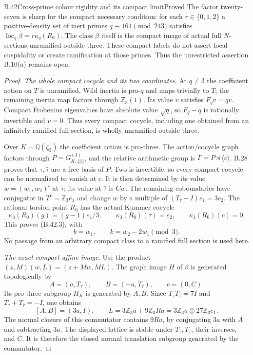 \begin{statement}{B.42}{Cross-prime colour rigidity and its compact limit}{Proved}
The factor twenty-seven is sharp for the compact necessary condition:
for each $r\in\{0,1,2\}$ a positive-density set of inert primes
$q\equiv161\pmod{243}$ satisfies
$\operatorname{loc}_q\beta=r\kappa_q(R_0)$.
The class $\beta$ itself is the compact image of actual full
$N$-sections unramified outside three.  These compact labels do not
assert local cuspidality or create ramification at those primes.
Thus the unrestricted assertion B.10(a) remains open.
\end{statement}
\begin{proof}
\emph{The whole compact cocycle and its two coordinates.}
At $q\ne3$ the coefficient action on $T$ is unramified.
Wild inertia is pro-$q$ and maps trivially to $T$; the remaining
inertia map factors through $\mathbb Z_3(1)$.  Its value $v$
satisfies $F_qv=qv$.  Compact Frobenius eigenvalues have absolute
value $\sqrt q$, so $F_q-q$ is rationally invertible and $v=0$.
Thus every compact cocycle, including one obtained from an infinitely
ramified full section, is wholly unramified outside three.

Over $K=\mathbb Q(\zeta_3)$ the coefficient action is pro-three.
The action/cocycle graph factors through
$P=G_{K,\{3\}}^{(3)}$, and the relative arithmetic group is
$\Gamma=P\rtimes\langle c\rangle$.  B.28 proves that
$\tau,\bar\tau$ are a free basis of $P$.  Two is invertible, so
every compact cocycle can be normalized to vanish at $c$.
It is then determined by its value $w=(w_1,w_2)^t$ at $\tau$;
its value at $\bar\tau$ is $Cw$.
The remaining coboundaries have conjugator in
$T^c=\mathbb Z_3e_1$ and change $w$ by a multiple of
$(T_\tau-I)e_1=3e_2$.  The rational torsion point $R_0$ has
the actual Kummer cocycle
\[
 \kappa_3(R_0)(g)=(g-1)e_1/3,
 \qquad \kappa_3(R_0)(\tau)=e_2,
 \qquad \kappa_3(R_0)(c)=0.
\]
This proves (B.42.3), with
\[
                   b=w_1,\qquad k=w_2-2w_1\pmod3.
                                                               \tag{B.42.6}
\]
No passage from an arbitrary compact class to a ramified full
section is used here.

\emph{The exact compact affine image.}
Use the product $(z,M)(w,L)=(z+Mw,ML)$.
The graph image $H$ of $\beta$ is generated topologically by
\[
 A=(a,T_\tau),\qquad B=(-a,T_{\bar\tau}),\qquad c=(0,C).
\]
Its pro-three subgroup $H_K$ is generated by $A,B$.
Since $T_\tau T_{\bar\tau}=7I$ and
$T_\tau+T_{\bar\tau}=-I$, one obtains
\[
 [A,B]=(3a,I),\qquad
 L=3\mathbb Z_3a+9\mathbb Z_3Ra
       =3\mathbb Z_3a\oplus27\mathbb Z_3e_1.
                                                               \tag{B.42.7}
\]
The normal closure of this commutator contains $9Ra$, by
conjugating $3a$ with $A$ and subtracting $3a$.
The displayed lattice is stable under $T_\tau,T_{\bar\tau}$,
their inverses, and $C$.  It is therefore the closed normal
translation subgroup generated by the commutator.


\end{proof}
